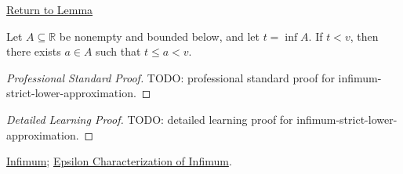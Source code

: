 \newpage
{}
\label{prf:infimum-strict-lower-approximation}

\begin{remark*}[Return]
\hyperref[lem:infimum-strict-lower-approximation]{Return to Lemma}
\end{remark*}

\begin{lemma*}
Let $A\subseteq\mathbb{R}$ be nonempty and bounded below, and let
$t=\inf A$. If $t<v$, then there exists $a\in A$ such that $t\le a<v$.
\end{lemma*}

\begin{proof}[Professional Standard Proof]
\LRAProofBodyStart
TODO: professional standard proof for infimum-strict-lower-approximation.
\end{proof}

\begin{proof}[Detailed Learning Proof]
\LRAProofBodyStart
TODO: detailed learning proof for infimum-strict-lower-approximation.
\end{proof}

\begin{remark*}
\end{remark*}

\begin{dependencies}
\hyperref[def:infimum]{Infimum};
\hyperref[def:epsilon-characterization-of-infimum]{Epsilon Characterization of Infimum}.
\end{dependencies}

\clearpage
